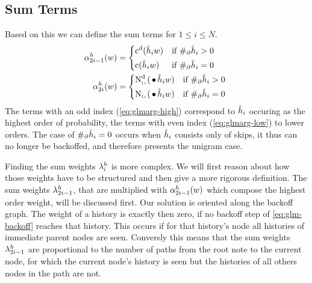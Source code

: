 \subsection{Sum Terms}

Based on this we can define the sum terms for $1 \leq i \leq N$.
\begin{subequations}
  \begin{align}
    \label{eq:glmarg-high}
    \SumArg_{2 i - 1}^h(w) &=
      \begin{dcases*}
        \DiscountedCount(\DerivedHistory[i] w)        & if $\NumSkpOp{\DerivedHistory[i]} > 0$ \\
        \Count(\DerivedHistory[i] w)                  & if $\NumSkpOp{\DerivedHistory[i]} = 0$
      \end{dcases*} \\
    \label{eq:glmarg-low}
    \SumArg_{2 i}^h(w) &=
      \begin{dcases*}
        \DiscountedCount*(\WSkp \DerivedHistory[i] w) & if $\NumSkpOp{\DerivedHistory[i]} > 0$ \\
        \ContCountIp(\WSkp \DerivedHistory[i] w)      & if $\NumSkpOp{\DerivedHistory[i]} = 0$
      \end{dcases*}
  \end{align}
\end{subequations}
The terms with an odd index (\cref{eq:glmarg-high}) correspond to
$\DerivedHistory[i]$ occuring as the highest order of probability, the terms
with even index (\cref{eq:glmarg-low}) to lower orders.
The case of $\NumSkpOp{\DerivedHistory[i]} = 0$ occurs when $\DerivedHistory[i]$
consists only of skips, it thus can no longer be backoffed, and therefore
presents the unigram case.

Finding the sum weights $\lambda^h_i$ is more complex.
We will first reason about how those weights have to be structured and then
give a more rigorous definition.
The sum weights $\lambda^h_{2 i - 1}$, that are multiplied with
$\alpha^h_{2 i - 1}(w)$ which compose the highest order weight, will be
discussed first.
Our solution is oriented along the backoff graph.
The weight of a history is exactly then zero, if no backoff step of
\cref{eq:glm-backoff} reaches that history.
This occurs if for that history's node all histories of immediate parent nodes
are seen.
Conversly this means that the sum weights $\lambda^h_{2 i - 1}$ are proportional
to the number of paths from the root note to the current node, for which the
current node's history is seen but the histories of all others nodes in the
path are not.

